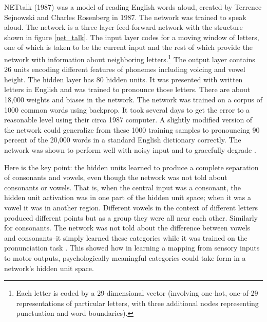 NETtalk (1987) \cite{sejnowski1987parallel} was a model of reading English words aloud, created by Terrence Sejnowski and Charles Rosenberg in 1987. The network was trained to speak aloud. The network is a three layer feed-forward network with the structure shown in figure \ref{net_talk}. The input layer codes for a moving window of letters, one of which is taken to be the current input and  the rest of which provide the network with information about neighboring letters.\footnote{Each letter is coded by a 29-dimensional vector (involving one-hot, one-of-29 representations of particular letters, with three additional nodes representing punctuation and word boundaries).} The output layer contains 26 units encoding different features of phonemes including voicing and vowel height. The hidden layer has 80 hidden units. It was presented with written letters in English and was trained to pronounce those letters. There are about 18,000 weights and biases in the network. The network was trained on a corpus of 1000 common words using backprop. It took several days to get the error to a reasonable level using their circa 1987 computer. A slightly modified version of the network could generalize from these 1000 training samples to pronouncing 90 percent of the 20,000 words in a standard English dictionary correctly. The network was shown to perform well with noisy input and to gracefully degrade \cite{sejnowski1987parallel}. 

Here is the key point: the hidden units learned to produce a complete separation of consonants and vowels, even though the network was not told about consonants or vowels. That is, when the central input was a consonant, the hidden unit activation was in one part of the hidden unit space; when it was a vowel it was in another region. Different vowels in the context of different letters produced different points but as a group they were all near each other. Similarly for consonants. The network was not told about the difference between vowels and consonants--it simply learned these categories while it was trained on the pronunciation task \cite{sejnowski1987parallel}. This showed how in learning a mapping from sensory inputs to motor outputs, psychologically meaningful categories could take form in a network's hidden unit space.

